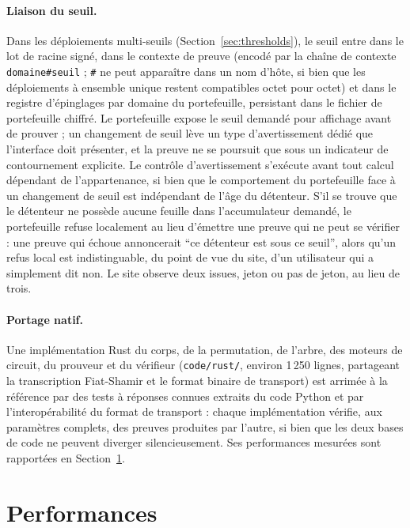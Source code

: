 \documentclass[11pt]{article}
\theoremstyle{definition}
\begin{document}
\paragraph{Liaison du seuil.} Dans les déploiements multi-seuils
(Section~\ref{sec:thresholds}), le seuil entre dans le lot de racine signé, dans le
contexte de preuve (encodé par la chaîne de contexte \texttt{domaine\#seuil} ; \texttt{\#}
ne peut apparaître dans un nom d'hôte, si bien que les déploiements à ensemble unique
restent compatibles octet pour octet) et dans le registre d'épinglages par domaine du
portefeuille, persistant dans le fichier de portefeuille chiffré. Le portefeuille expose
le seuil demandé pour affichage avant de prouver ; un changement de seuil lève un type
d'avertissement dédié que l'interface doit présenter, et la preuve ne se poursuit que sous
un indicateur de contournement explicite. Le contrôle d'avertissement s'exécute avant
tout calcul dépendant de l'appartenance, si bien que le comportement du portefeuille face
à un changement de seuil est indépendant de l'âge du détenteur. S'il se trouve que le
détenteur ne possède aucune feuille dans l'accumulateur demandé, le portefeuille refuse
localement au lieu d'émettre une preuve qui ne peut se vérifier : une preuve qui échoue
annoncerait ``ce détenteur est sous ce seuil'', alors qu'un refus local est
indistinguable, du point de vue du site, d'un utilisateur qui a simplement dit non. Le
site observe deux issues, jeton ou pas de jeton, au lieu de trois.

\paragraph{Portage natif.} Une implémentation Rust du corps, de la permutation, de
l'arbre, des moteurs de circuit, du prouveur et du vérifieur (\texttt{code/rust/}, environ
1\,250 lignes, partageant la transcription Fiat-Shamir et le format binaire de transport)
est arrimée à la référence par des tests à réponses connues extraits du code Python et par
l'interopérabilité du format de transport : chaque implémentation vérifie, aux paramètres
complets, des preuves produites par l'autre, si bien que les deux bases de code ne peuvent
diverger silencieusement. Ses performances mesurées sont rapportées en
Section~\ref{sec:perf}.

\section{Performances}
\label{sec:perf}
\end{document}
